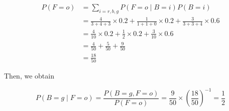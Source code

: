 \begin{align*}
    P(F = o)
    &= \sum_{i = r, b, g}{P(F = o \mid B = i)P(B = i)} \\
    &= \frac{4}{3 + 4 + 3} \times 0.2 + \frac{1}{1 + 1 + 0} \times 0.2 + \frac{3}{3 + 3 + 4} \times 0.6 \\
    &= \frac{4}{10} \times 0.2 + \frac{1}{2} \times 0.2 + \frac{3}{10} \times 0.6 \\
    &= \frac{4}{50} + \frac{5}{50} + \frac{9}{50} \\
    &= \frac{18}{50}
\end{align*}

Then, we obtain

\[
    P(B = g \mid F = o) = \frac{P(B = g, F = o)}{P(F = o)} = \frac{9}{50} \times \left(\frac{18}{50}\right)^{-1} = \frac{1}{2}
\]

